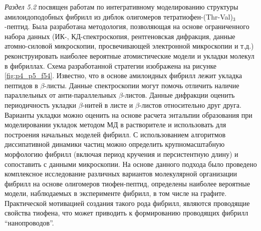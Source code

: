 \textit{Раздел 5.2} посвящен работам по интегративному моделированию структуры амилоидоподобных фибрилл из диблок олигомеров тетратиофен-(Thr-Val)$_3$-пептид. Была разработана методология, позволяющая на основе ограниченного набора данных (ИК-, КД-спектроскопия, рентгеновская дифракция, данные атомно-силовой микроскопии, просвечивающей электронной микроскопии и т.д.) реконструировать наиболее вероятные атомистические модели и укладки молекул в фибриллах. Схема разработанной стратегии изображена на рисунке \ref{fig:p4_p5_f54}. Известно, что в основе амилоидных фибрилл  лежит укладка пептидов в $\beta$-листы.
Данные спектроскопии могут помочь отличить наличие параллельных от анти-параллельных $\beta$-листов. Данные дифракции оценить периодичность укладки $\beta$-нитей в листе и $\beta$-листов относительно друг друга. Варианты укладки можно оценить на основе расчета энтальпии образования при моделировании укладок методом МД в растворителе и использовать для построения начальных моделей фибрилл. С использованием алгоритмов диссипативной динамики частиц можно определить крупномасштабную морфологию фибрилл (включая период кручения и персистентную длину) и сопоставить с данными микроскопии. На основе данного подхода было проведено комплексное исследование различных вариантов молекулярной организации фибрилл на основе олигомеров тиофен-пептид, определены наиболее вероятные модели, наблюдаемых в эксперименте фибрилл, в том числе на графите. Практической мотивацией создания такого рода фибрилл, являются проводящие свойства тиофена, что может приводить к формированию проводящих фибрилл ``нанопроводов''.  

